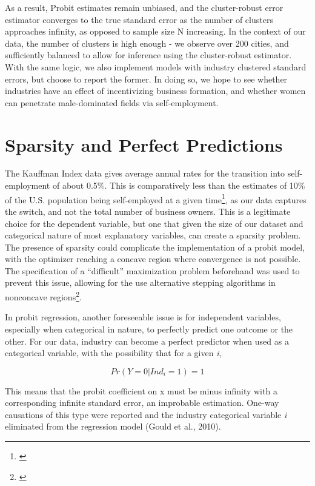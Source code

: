As a result, Probit estimates remain unbiased, and the cluster-robust error estimator converges to the true standard error as the number of clusters approaches infinity, as opposed to sample size N increasing. In the context of our data, the number of clusters is high enough - we observe over 200 cities, and sufficiently balanced to allow for inference using the cluster-robust estimator. With the same logic, we also implement models with industry clustered standard errors, but choose to report the former. In doing so, we hope to see whether industries have an effect of incentivizing business formation, and whether women can penetrate male-dominated fields via self-employment. 

\section{Sparsity and Perfect Predictions}

The Kauffman Index data gives average annual rates for the transition into self-employment of about 0.5\%. This is comparatively less than the estimates of 10\% of the U.S. population being self-employed at a given time\footnote{\cite{ChatterjiGlaeserKerr2014}}, as our data captures the switch, and not the total number of business owners. This is a legitimate choice for the dependent variable, but one that given the size of our dataset and categorical nature of most explanatory variables, can create a sparsity problem. The presence of sparsity could complicate the implementation of a probit model, with the optimizer reaching a concave region where convergence is not possible. The specification of a “difficult” maximization problem beforehand was used to prevent this issue, allowing for the use alternative stepping algorithms in nonconcave regions\footnote{\cite{GouldPitbladoPoi2010}}.

In probit regression, another foreseeable issue is for independent variables, especially when categorical in nature, to perfectly predict one outcome or the other. For our data, industry can become a perfect predictor when used as a categorical variable, with the possibility that for a given \textit{i},

\begin{dmath}
Pr(Y = 0 | Ind_i = 1) = 1
\end{dmath}

This means that the probit coefficient on x must be minus infinity with a corresponding infinite standard error, an improbable estimation. One-way causations of this type were reported and the industry categorical variable \textit{i} eliminated from the regression model (Gould et al., 2010). 

